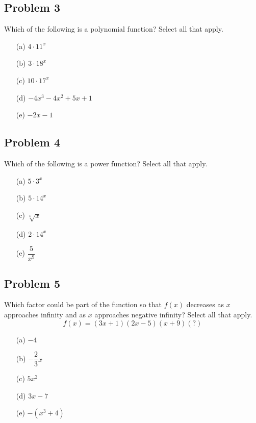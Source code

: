\documentclass[12pt]{article}
\begin{document}
\subsection*{Problem 3}
Which of the following is a polynomial function? Select all that apply.

    \begin{enumerate}
        \item[(a)] \(4 \cdot 11^x\)
        \item[(b)] \(3 \cdot 18^x\)
        \item[(c)] \(10 \cdot 17^x\)
        \item[(d)] \(-4x^3-4x^2+5x+1\)
        \item[(e)] \(-2x-1\)
    \end{enumerate}

\subsection*{Problem 4}
Which of the following is a power function? Select all that apply.

    \begin{enumerate}
        \item[(a)] \(5 \cdot 3^x\)
        \item[(b)] \(5 \cdot 14^x\)
        \item[(c)] \(\sqrt[6]{x}\)
        \item[(d)] \(2 \cdot 14^x\)
        \item[(e)] \(\dfrac{5}{x^9}\)
    \end{enumerate}

\subsection*{Problem 5}
Which factor could be part of the function so that \(f(x)\) decreases as \(x\) approaches infinity and as \(x\) approaches negative infinity? Select all that apply.
\[f(x)=(3x+1)(2x-5)(x+9)(?)\]

    \begin{enumerate}
        \item[(a)] \(-4\)
        \item[(b)] \(-\dfrac{2}{3}x\)
        \item[(c)] \(5x^2\)
        \item[(d)] \(3x-7\)
        \item[(e)] \(-(x^3+4)\)
    \end{enumerate}
\end{document}
